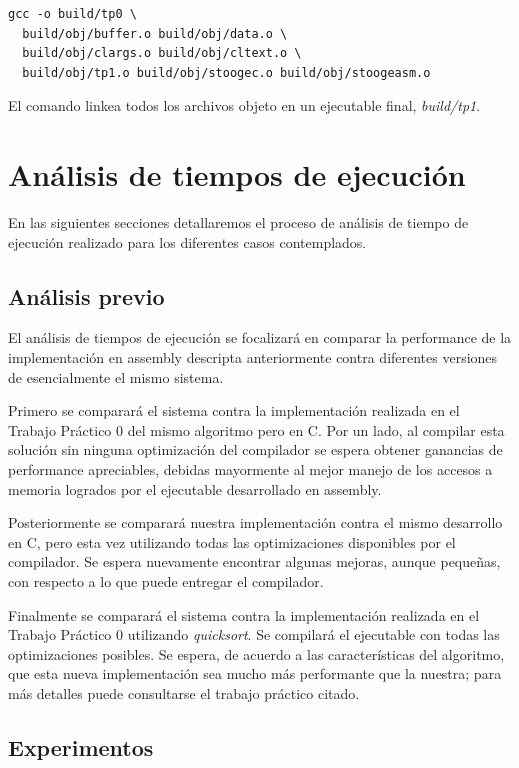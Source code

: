 \documentclass[a4paper,11pt]{article}
\begin{document}
\begin{lstlisting}
gcc -o build/tp0 \
  build/obj/buffer.o build/obj/data.o \
  build/obj/clargs.o build/obj/cltext.o \
  build/obj/tp1.o build/obj/stoogec.o build/obj/stoogeasm.o
\end{lstlisting}

El comando linkea todos los archivos objeto en un ejecutable final,
\textit{build/tp1}.

\section{Análisis de tiempos de ejecución}

En las siguientes secciones detallaremos el proceso de análisis de tiempo de
ejecución realizado para los diferentes casos contemplados.

\subsection{Análisis previo}\label{sec:tiempos}

El análisis de tiempos de ejecución se focalizará en comparar la performance de
la implementación en assembly descripta anteriormente contra diferentes
versiones de esencialmente el mismo sistema.

Primero se comparará el sistema contra la implementación realizada en el
Trabajo Práctico 0 del mismo algoritmo pero en C. Por un lado, al compilar esta
solución sin ninguna optimización del compilador se espera obtener ganancias de
performance apreciables, debidas mayormente al mejor manejo de los accesos a
memoria logrados por el ejecutable desarrollado en assembly.

Posteriormente se comparará nuestra implementación contra el mismo desarrollo
en C, pero esta vez utilizando todas las optimizaciones disponibles por el
compilador. Se espera nuevamente encontrar algunas mejoras, aunque pequeñas,
con respecto a lo que puede entregar el compilador.

Finalmente se comparará el sistema contra la implementación realizada en el
Trabajo Práctico 0 utilizando \textit{quicksort}. Se compilará el ejecutable
con todas las optimizaciones posibles. Se espera, de acuerdo a las
características del algoritmo, que esta nueva implementación sea mucho más
performante que la nuestra; para más detalles puede consultarse el trabajo
práctico citado.

\subsection{Experimentos}
\end{document}
